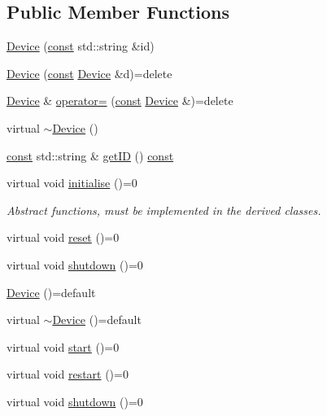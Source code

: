 \subsection*{Public Member Functions}
\begin{DoxyCompactItemize}
\item 
\hyperlink{class_device_a831fcd5aa1de172a75977ef04bbca56a}{Device} (\hyperlink{functions__c_8js_afacfd9c985d225bb07483b887a801b6f}{const} std\+::string \&id)
\item 
\hyperlink{class_device_ac396693bdad11f7cd4209da76fe651f3}{Device} (\hyperlink{functions__c_8js_afacfd9c985d225bb07483b887a801b6f}{const} \hyperlink{class_device}{Device} \&d)=delete
\item 
\hyperlink{class_device}{Device} \& \hyperlink{class_device_a25d835db7132fe7f8fd33ace1e19a780}{operator=} (\hyperlink{functions__c_8js_afacfd9c985d225bb07483b887a801b6f}{const} \hyperlink{class_device}{Device} \&)=delete
\item 
virtual \hyperlink{class_device_af5f3f693be6b0dbde83d03bf7a336d2c}{$\sim$\+Device} ()
\item 
\hyperlink{functions__c_8js_afacfd9c985d225bb07483b887a801b6f}{const} std\+::string \& \hyperlink{class_device_a682e72b3243a703e7b6080f5f1c9553b}{get\+ID} () \hyperlink{functions__c_8js_afacfd9c985d225bb07483b887a801b6f}{const} 
\item 
virtual void \hyperlink{class_device_a66d75dab26ca84259877ca3fe5f2c2bd}{initialise} ()=0
\begin{DoxyCompactList}\small\item\em Abstract functions, must be implemented in the derived classes. \end{DoxyCompactList}\item 
virtual void \hyperlink{class_device_a6e43162e890cb40eafb923b0c94d167a}{reset} ()=0
\item 
virtual void \hyperlink{class_device_aab20e3f9dc696c6a1153776d526dcc0b}{shutdown} ()=0
\item 
\hyperlink{class_device_aeedac8c21921d1379d33ffc0e72a7b07}{Device} ()=default
\item 
virtual \hyperlink{class_device_a6fef4f7180512c7517c9696cd95e503a}{$\sim$\+Device} ()=default
\item 
virtual void \hyperlink{class_device_acaacba2e97dfde1b53c34970d2ebaef9}{start} ()=0
\item 
virtual void \hyperlink{class_device_a5d4a86da7f8d97cec939831239a5a032}{restart} ()=0
\item 
virtual void \hyperlink{class_device_aab20e3f9dc696c6a1153776d526dcc0b}{shutdown} ()=0
\end{DoxyCompactItemize}


